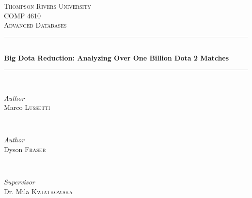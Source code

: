\begin{titlepage} %
	\newcommand{\HRule}{\rule{\linewidth}{0.5mm}} %
	
	\center %
	
	
	\textsc{\LARGE Thompson Rivers University}\\[1.5cm] %
	
	\textsc{\Large COMP 4610}\\[0.5cm] %
	
	\textsc{\large Advanced Databases}\\[0.5cm] %
	
	
	\HRule\\[0.4cm]
	
	{\huge\bfseries Big Dota Reduction: Analyzing Over One Billion Dota 2 Matches}\\[0.4cm] %
	
	\HRule\\[1.5cm]
	
	
	\begin{minipage}{0.2\textwidth}
		\begin{flushleft}
			\large
			\textit{Author}\\
			Marco \textsc{Lussetti} %
		\end{flushleft}
	\end{minipage}
	~
	\begin{minipage}{0.2\textwidth}
		\begin{flushleft}
			\large
			\textit{Author}\\
			Dyson \textsc{Fraser} %
		\end{flushleft}
	\end{minipage}
	~
	\begin{minipage}{0.2\textwidth}
		\begin{flushright}
			\large
			\textit{Supervisor}\\
			Dr. Mila \textsc{Kwiatkowska} %
		\end{flushright}
	\end{minipage}
	

\end{titlepage}
